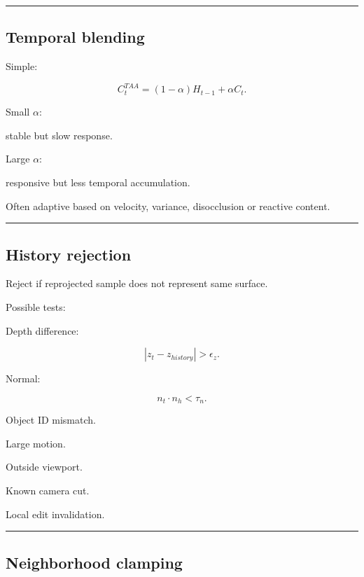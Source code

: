 \begin{center}\rule{0.5\linewidth}{0.5pt}\end{center}

\subsection{Temporal blending}\label{04-visual-computing-ii-ch040-temporal-blending}

Simple:

\[
\boxed{
C_t^{TAA}
=
(1-\alpha)
H_{t-1}
+
\alpha
C_t.
}
\]

Small \(\alpha\):

stable but slow response.

Large \(\alpha\):

responsive but less temporal accumulation.

Often adaptive based on velocity, variance, disocclusion or reactive content.

\begin{center}\rule{0.5\linewidth}{0.5pt}\end{center}

\subsection{History rejection}\label{04-visual-computing-ii-ch040-history-rejection}

Reject if reprojected sample does not represent same surface.

Possible tests:

Depth difference:

\[
|z_t-z_{history}|>\epsilon_z.
\]

Normal:

\[
n_t\cdot n_h<\tau_n.
\]

Object ID mismatch.

Large motion.

Outside viewport.

Known camera cut.

Local edit invalidation.

\begin{center}\rule{0.5\linewidth}{0.5pt}\end{center}

\subsection{Neighborhood clamping}\label{04-visual-computing-ii-ch040-neighborhood-clamping}

